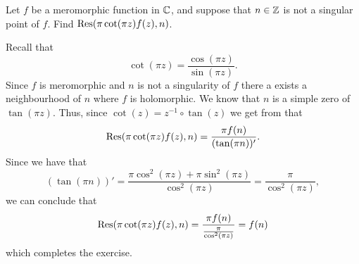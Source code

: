 \documentclass[11pt,a4paper]{article}
\begin{document}
\begin{exercise}
  Let $f$ be a meromorphic function in $\mathbb{C}$,
  and suppose that $n \in \mathbb{Z}$ is not a singular point of $f$.
  Find $\operatorname{Res}(\pi \cot (\pi z) f(z), n)$.
\end{exercise}
\begin{solution}
  Recall that
  \[
    \cot(\pi z) =
    \frac{\cos(\pi z)}{\sin(\pi z)}.
  \]
  Since $f$ is meromorphic and $n$ is not a singularity of $f$
  there a exists a neighbourhood of $n$ where $f$ is holomorphic.
  We know that $n$ is a simple zero of $\tan(\pi z)$.
  Thus, since $\cot(z) = z^{-1} \circ \tan(z)$ we get from
   that
  \[
    \operatorname{Res}(\pi \cot(\pi z) f(z),n) = \frac{\pi f(n)}{(\tan(\pi n))'}.
  \]
  Since we have that
  \[
    (\tan(\pi n))' =
    \frac{\pi \cos^{2}(\pi z) + \pi \sin^{2}(\pi z)}{\cos^{2}(\pi z)} =
    \frac{\pi}{\cos^2(\pi z)},
  \]
  we can conclude that
  \[
    \operatorname{Res}(\pi \cot(\pi z) f(z),n) =
    \frac{\pi f(n)}{\frac{\pi}{\cos^2(\pi z)}} =
    f(n)
  \]
  which completes the exercise.
\end{solution}
\end{document}
